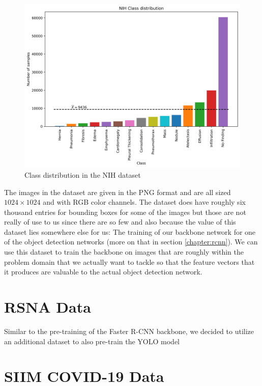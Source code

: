 \begin{figure}
	\centering
	\includegraphics[width=.8\linewidth]{img/nih_class_distribution.png}
	\caption{Class distribution in the NIH dataset}
	\label{fig:nih_classes}
\end{figure}

The images in the dataset are given in the PNG format and are all sized $1024 \times 1024$ and with RGB color channels. The dataset does have roughly six thousand entries for bounding boxes for some of the images but those are not really of use to us since there are so few and also because the value of this dataset lies somewhere else for us: The training of our backbone network for one of the object detection networks (more on that in section \vref{chapter:rcnn}). We can use this dataset to train the backbone on images that are roughly within the problem domain that we actually want to tackle so that the feature vectors that it produces are valuable to the actual object detection network. 

\section{RSNA Data}\label{data:rsna}

Similar to the pre-training of the Faster \ac{R-CNN} backbone, we decided to utilize an additional dataset to also pre-train the \ac{YOLO} model

\section{SIIM COVID-19 Data}\label{data:siim}

